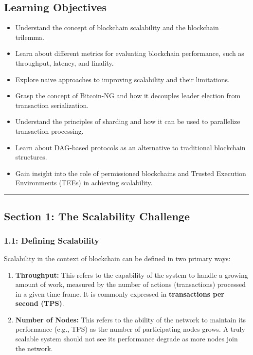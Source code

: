 \subsection{Learning Objectives}\label{learning-objectives}

\begin{itemize}
\tightlist
\item
  Understand the concept of blockchain scalability and the blockchain
  trilemma.
\item
  Learn about different metrics for evaluating blockchain performance,
  such as throughput, latency, and finality.
\item
  Explore naive approaches to improving scalability and their
  limitations.
\item
  Grasp the concept of Bitcoin-NG and how it decouples leader election
  from transaction serialization.
\item
  Understand the principles of sharding and how it can be used to
  parallelize transaction processing.
\item
  Learn about DAG-based protocols as an alternative to traditional
  blockchain structures.
\item
  Gain insight into the role of permissioned blockchains and Trusted
  Execution Environments (TEEs) in achieving scalability.
\end{itemize}

\begin{center}\rule{0.5\linewidth}{0.5pt}\end{center}

\subsection{Section 1: The Scalability
Challenge}\label{section-1-the-scalability-challenge}

\subsubsection{1.1: Defining Scalability}\label{defining-scalability}

Scalability in the context of blockchain can be defined in two primary
ways:

\begin{enumerate}
\def\labelenumi{\arabic{enumi}.}
\tightlist
\item
  \textbf{Throughput:} This refers to the capability of the system to
  handle a growing amount of work, measured by the number of actions
  (transactions) processed in a given time frame. It is commonly
  expressed in \textbf{transactions per second (TPS)}.
\item
  \textbf{Number of Nodes:} This refers to the ability of the network to
  maintain its performance (e.g., TPS) as the number of participating
  nodes grows. A truly scalable system should not see its performance
  degrade as more nodes join the network.
\end{enumerate}


